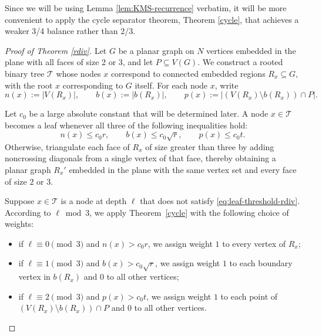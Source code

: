\documentclass[11pt]{article}
\theoremstyle{plain}
\theoremstyle{definition}
\theoremstyle{remark}
\begin{document}
\noindent Since we will be using Lemma \ref{lem:KMS-recurrence} verbatim, it will be more convenient to apply the cycle separator theorem, Theorem \ref{cycle}, that achieves a weaker 3/4 balance rather than 2/3.  


\begin{proof}[Proof of Theorem \ref{rdiv}]
Let $G$ be a planar graph on $N$ vertices embedded in the plane with all faces of size 2 or 3, and let $P \subseteq V(G)$.  We construct a rooted binary tree \(\mathcal T\) whose nodes \(x\) correspond to connected embedded regions \(R_x\subseteq G\), with the root $\hat x$ corresponding to \(G\) itself. For each node \(x\), write
\[
n(x):=|V(R_x)|,\qquad
b(x):=|b(R_x)|,\qquad
p(x):=|(V(R_x)\setminus b(R_x))\cap P|.
\]

Let $c_0$ be a large absolute constant that will be determined later.  A node \(x \in \mathcal T\) becomes a leaf whenever all three of the following inequalities hold: 
\begin{equation}\label{eq:leaf-threshold-rdiv}
n(x)\le c_0r,\qquad
b(x)\le c_0\sqrt r,\qquad
p(x)\le c_0t.
\end{equation}
Otherwise, triangulate each face of \(R_x\) of size greater than three by adding noncrossing diagonals from a single vertex of that face, thereby obtaining a planar graph \(R_x'\) embedded in the plane with the same vertex set and every face of size \(2\) or \(3\).


Suppose \(x \in \mathcal T\) is a node at depth \(\ell\) that does not satisfy \eqref{eq:leaf-threshold-rdiv}. According to \(\ell \bmod 3\), we apply Theorem~\ref{cycle} with the following choice of weights:
\begin{itemize}
    \item if \(\ell\equiv 0 \pmod 3\) and \(n(x) > c_0r\), we assign weight \(1\) to every vertex of \(R_x\);
    \item if \(\ell\equiv 1 \pmod 3\) and \(b(x) > c_0\sqrt{r}\), we assign weight \(1\) to each boundary vertex in \(b(R_x)\) and \(0\) to all other vertices;
    \item if \(\ell\equiv 2 \pmod 3\) and \(p(x) > c_0t\), we assign weight \(1\) to each point of \((V(R_x)\setminus b(R_x))\cap P\) and \(0\) to all other vertices.
\end{itemize}


\end{proof}
\end{document}
